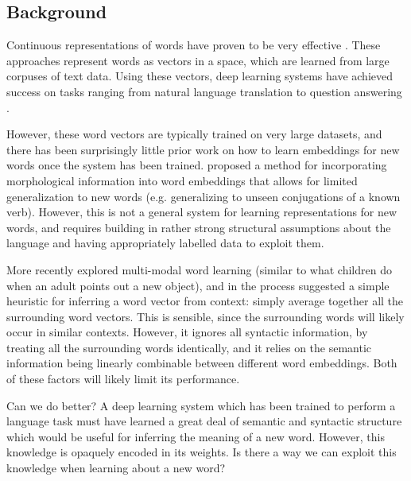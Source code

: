 \documentclass{article}
\begin{document}
\subsection{Background}
Continuous representations of words have proven to be very effective \cite[e.g.]{Mikolov2013, Pennington2014}. These approaches represent words as vectors in a space, which are learned from large corpuses of text data. Using these vectors, deep learning systems have achieved success on tasks ranging from natural language translation \cite[e.g.]{Wu2016} to question answering \cite[e.g.]{Santoro2017}. \par
However, these word vectors are typically trained on very large datasets, and there has been surprisingly little prior work on how to learn embeddings for new words once the system has been trained. \citet{Cotterell2016} proposed a method for incorporating morphological information into word embeddings that allows for limited generalization to new words (e.g. generalizing to unseen conjugations of a known verb). However, this is not a general system for learning representations for new words, and requires building in rather strong structural assumptions about the language and having appropriately labelled data to exploit them. \par
More recently \citet{Lazaridou2017} explored multi-modal word learning (similar to what children do when an adult points out a new object), and in the process suggested a simple heuristic for inferring a word vector from context: simply average together all the surrounding word vectors. This is sensible, since the surrounding words will likely occur in similar contexts. However, it ignores all syntactic information, by treating all the surrounding words identically, and it relies on the semantic information being linearly combinable between different word embeddings. Both of these factors will likely limit its performance. \par
Can we do better? A deep learning system which has been trained to perform a language task must have learned a great deal of semantic and syntactic structure which would be useful for inferring the meaning of a new word. However, this knowledge is opaquely encoded in its weights. Is there a way we can exploit this knowledge when learning about a new word? \par
\end{document}
